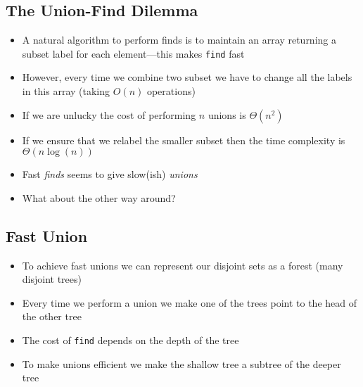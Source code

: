 
\begin{slide}
\section[-1]{The Union-Find Dilemma}

\begin{PauseHighLight}
  \begin{itemize}
  \item A natural algorithm to perform finds is to maintain an
    array returning a subset label for each element\pause---this makes
    \texttt{find} fast\pause
  \item However, every time we combine two subset we have to change all
    the labels in this array (taking $O(n)$ operations)\pause
  \item If we are unlucky the cost of performing $n$ unions is
    $\Theta(n^2)$\pause
  \item If we ensure that we relabel the smaller subset then the time
    complexity is $\Theta(n \log(n))$\pause
  \item Fast \textit{finds} seems to give slow(ish) \textit{unions}\pause
  \item What about the other way around?\pause
  \end{itemize}
\end{PauseHighLight}

\end{slide}


\begin{slide}
\section{Fast Union}

\begin{PauseHighLight}
  \begin{itemize}
  \item To achieve fast unions we can represent our disjoint sets as a
    forest (many disjoint trees)\pause
  \item Every time we perform a union we make one of the trees point to
    the head of the other tree\pause
  \item The cost of \texttt{find} depends on the depth of the tree\pause
  \item To make unions efficient we make the shallow tree a subtree of
    the deeper tree\pause
  \end{itemize}
\end{PauseHighLight}

\end{slide}


